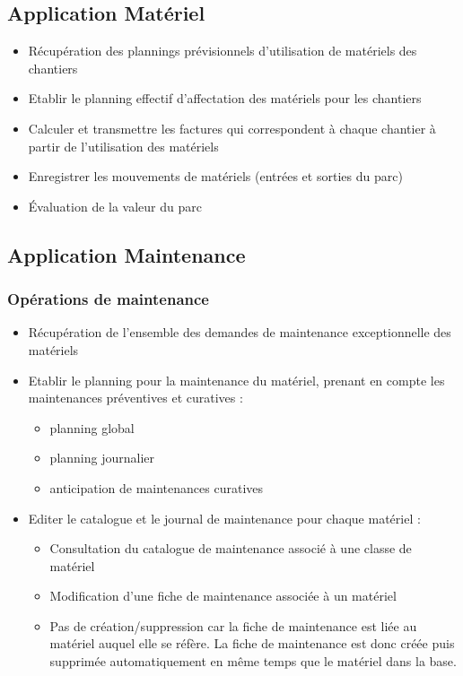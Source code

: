 \documentclass[twoside]{article}
\begin{document}
\subsection{Application Matériel}
\begin{itemize}
\item Récupération des plannings prévisionnels d'utilisation de matériels
des chantiers
\item Etablir le planning effectif d'affectation des
matériels pour les chantiers
\item Calculer et transmettre les factures qui correspondent à chaque chantier
à partir de l'utilisation des matériels
\item Enregistrer les mouvements de matériels (entrées et sorties du parc)
\item Évaluation de la valeur du parc
\end{itemize}


\subsection{Application Maintenance}
\subsubsection{Opérations de maintenance}
\begin{itemize}
\item Récupération de l'ensemble des demandes de maintenance exceptionnelle
des matériels
\item Etablir le planning pour la maintenance du matériel, prenant en
compte les maintenances préventives et curatives :
    \begin{itemize}
    \item planning global
    \item planning journalier
    \item anticipation de maintenances curatives
    \end{itemize}
\item Editer le catalogue et le  journal de maintenance pour chaque matériel :
    \begin{itemize}
    \item Consultation du catalogue de maintenance associé à une classe de 
    matériel
    \item Modification d'une fiche de maintenance associée à un matériel
    \item Pas de création/suppression car la fiche de maintenance est liée
    au matériel auquel elle se réfère. La fiche de maintenance est donc
    créée puis supprimée automatiquement en même temps que le matériel dans
    la base.
    \end{itemize}
\end{itemize}
\end{document}
